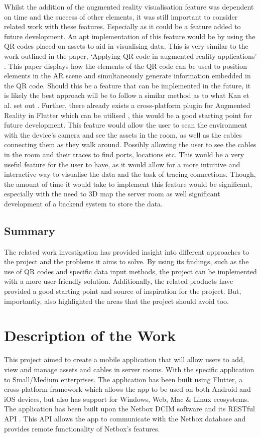 \documentclass [11pt,a4paper]{article}
\begin{document}
Whilst the addition of the augmented reality visualisation feature was dependent on time and the success of other elements, it was still important to consider related work with these features. Especially as it could be a feature added to future development. An apt implementation of this feature would be by using the QR codes placed on assets to aid in visualising data. This is very similar to the work outlined in the paper, `Applying QR code in augmented reality applications' \cite{applyingQR}. This paper displays how the elements of the QR code can be used to position elements in the AR scene and simultaneously generate information embedded in the QR code. Should this be a feature that can be implemented in the future, it is likely the best approach will be to follow a similar method as to what Kan et al. set out \cite{applyingQR}. Further, there already exists a cross-platform plugin for Augmented Reality in Flutter which can be utilised \cite{ar_flutter}, this would be a good starting point for future development. This feature would allow the user to scan the environment with the device's camera and see the assets in the room, as well as the cables connecting them as they walk around. Possibly allowing the user to see the cables in the room and their traces to find ports, locations etc. This would be a very useful feature for the user to have, as it would allow for a more intuitive and interactive way to visualise the data and the task of tracing connections. Though, the amount of time it would take to implement this feature would be significant, especially with the need to 3D map the server room as well significant development of a backend system to store the data.

\subsection{Summary}
\label{sec:related_summary}

The related work investigation has provided insight into different approaches to the project and the problems it aims to solve. By using its findings, such as the use of QR codes and specific data input methods, the project can be implemented with a more user-friendly solution. Additionally, the related products have provided a good starting point and source of inspiration for the project. But, importantly, also highlighted the areas that the project should avoid too.

\section{Description of the Work}
\label{sec:work}
This project aimed to create a mobile application that will allow users to add, view and manage assets and cables in server rooms. With the specific application to Small/Medium enterprises. The application has been built using Flutter, a cross-platform framework which allows the app to be used on both Android and iOS devices, but also has support for Windows, Web, Mac \& Linux ecosystems. The application has been built upon the Netbox DCIM software \cite{Netbox} and its RESTful API \cite{NetboxAPI}. This API allows the app to communicate with the Netbox database and provides remote functionality of Netbox's features.
\end{document}
